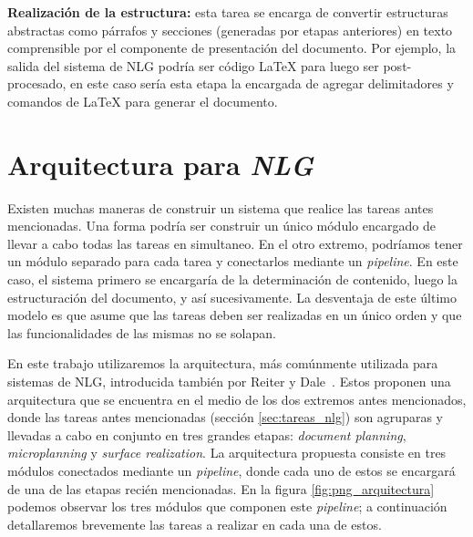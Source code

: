 \bigskip
\noindent
\textbf{Realización de la estructura:} esta tarea se encarga de convertir estructuras abstractas como párrafos y secciones (generadas por etapas anteriores) en texto comprensible por el componente de presentación del documento. Por ejemplo, la salida del sistema de NLG podría ser código LaTeX para luego ser post-procesado, en este caso sería esta etapa la encargada de agregar delimitadores y comandos de LaTeX para generar el documento. 

\section{Arquitectura para \textit{NLG}}
Existen muchas maneras de construir un sistema que realice las tareas antes mencionadas. Una forma podría ser construir un único módulo encargado de llevar a cabo todas las tareas en simultaneo. En el otro extremo, podríamos tener un módulo separado para cada tarea y conectarlos mediante un \emph{pipeline}. En este caso, el sistema primero se encargaría de la determinación de contenido, luego la estructuración del documento, y así sucesivamente. La desventaja de este último modelo es que asume que las tareas deben ser realizadas en un único orden y que las funcionalidades de las mismas no se solapan.

En este trabajo utilizaremos la arquitectura, más comúnmente utilizada para sistemas de NLG, introducida también por Reiter y Dale~\cite{reiter_dale}. Estos proponen una arquitectura que se encuentra en el medio de los dos extremos antes mencionados, donde las tareas antes mencionadas (sección \ref{sec:tareas_nlg}) son agruparas y llevadas a cabo en conjunto en tres grandes etapas: \emph{document planning}, \emph{microplanning} y \emph{surface realization}. La arquitectura propuesta consiste en tres módulos conectados mediante un \emph{pipeline}, donde cada uno de estos se encargará de una de las etapas recién mencionadas. En la figura \ref{fig:png_arquitectura} podemos observar los tres módulos que componen este \emph{pipeline}; a continuación detallaremos brevemente las tareas a realizar en cada una de estos.


